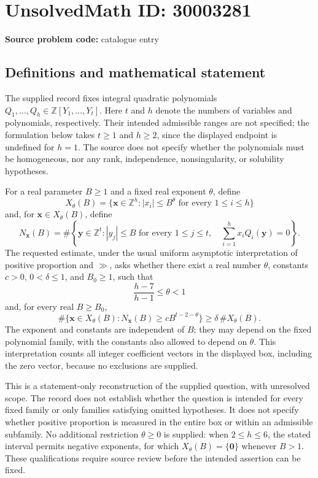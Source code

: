 \documentclass[11pt]{article}
\newcommand{\Z}{\mathbb{Z}}
\begin{document}
\section*{UnsolvedMath ID: 30003281}
\textbf{Source problem code:} catalogue entry
\subsection{Definitions and mathematical statement}
The supplied record fixes integral quadratic polynomials \(Q_1,\ldots,Q_h\in\Z[Y_1,\ldots,Y_t]\). Here \(t\) and \(h\) denote the numbers of variables and polynomials, respectively. Their intended admissible ranges are not specified; the formulation below takes \(t\geq1\) and \(h\geq2\), since the displayed endpoint is undefined for \(h=1\). The source does not specify whether the polynomials must be homogeneous, nor any rank, independence, nonsingularity, or solubility hypotheses.

For a real parameter \(B\geq1\) and a fixed real exponent \(\theta\), define
\[
X_\theta(B)=\{\mathbf x\in\Z^h: |x_i|\leq B^\theta\text{ for every }1\leq i\leq h\}
\]
and, for \(\mathbf x\in X_\theta(B)\), define
\[
N_{\mathbf x}(B)=\#\left\{\mathbf y\in\Z^t: |y_j|\leq B\text{ for every }1\leq j\leq t,\quad \sum_{i=1}^h x_iQ_i(\mathbf y)=0\right\}.
\]
The requested estimate, under the usual uniform asymptotic interpretation of positive proportion and \(\gg\), asks whether there exist a real number \(\theta\), constants \(c>0\), \(0<\delta\leq1\), and \(B_0\geq1\), such that
\[
\frac{h-7}{h-1}\leq\theta<1
\]
and, for every real \(B\geq B_0\),
\[
\#\{\mathbf x\in X_\theta(B): N_{\mathbf x}(B)\geq cB^{t-2-\theta}\}
\geq \delta\,\#X_\theta(B).
\]
The exponent and constants are independent of \(B\); they may depend on the fixed polynomial family, with the constants also allowed to depend on \(\theta\). This interpretation counts all integer coefficient vectors in the displayed box, including the zero vector, because no exclusions are supplied.

This is a statement-only reconstruction of the supplied question, with unresolved scope. The record does not establish whether the question is intended for every fixed family or only families satisfying omitted hypotheses. It does not specify whether positive proportion is measured in the entire box or within an admissible subfamily. No additional restriction \(\theta\geq0\) is supplied: when \(2\leq h\leq6\), the stated interval permits negative exponents, for which \(X_\theta(B)=\{\mathbf0\}\) whenever \(B>1\). These qualifications require source review before the intended assertion can be fixed.
\end{document}

